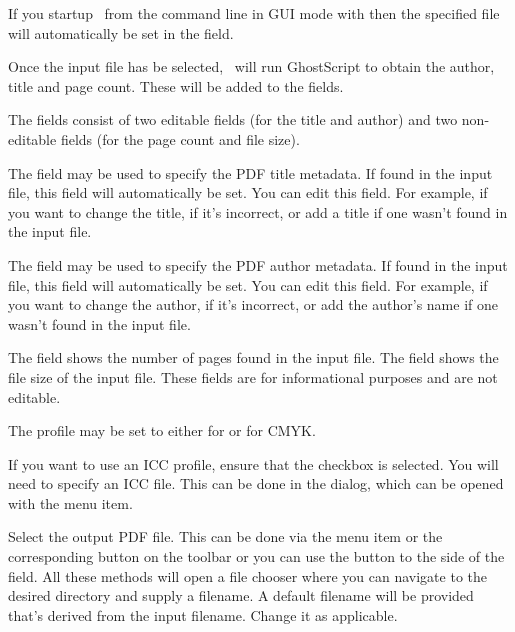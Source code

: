 \begin{information}
If you startup \Jmakepdfx\ from the command line in \gls{GUI} mode
with  then the specified file will automatically be
set in the  field.
\end{information}

Once the input file has be selected, \Jmakepdfx\ will run
GhostScript to obtain the author, title and page count.
These will be added to the  fields.

The  fields consist of two editable fields
(for the title and author) and two non-editable fields (for the page
count and file size).

The  field may be used to specify the PDF
title metadata. If found in the input file, this field will
automatically be set. You can edit this field. For example, if you
want to change the title, if it's incorrect, or add a title if one
wasn't found in the input file.

The  field may be used to specify the PDF
author metadata. If found in the input file, this field will
automatically be set. You can edit this field. For example, if you
want to change the author, if it's incorrect, or add the author's
name if one wasn't found in the input file.

The  field shows the number of pages found
in the input file. 
The  field shows the file size of the input file.
These fields are for informational purposes and are not editable.

The profile may be set to either 
for  or  for CMYK.

If you want to use an \gls{ICC} profile, ensure that the
 checkbox is selected. You will need to
specify an \gls{ICC} file. This can be done in the
 dialog,
which can be opened with the  menu item.

Select the output PDF file. This can be done via the 
 menu item or the corresponding button on the
toolbar or you can use the  button to the
side of the  field. All these methods will open a
file chooser where you can navigate to the desired directory and
supply a filename. A default filename will be provided that's derived from
the input filename. Change it as applicable.

